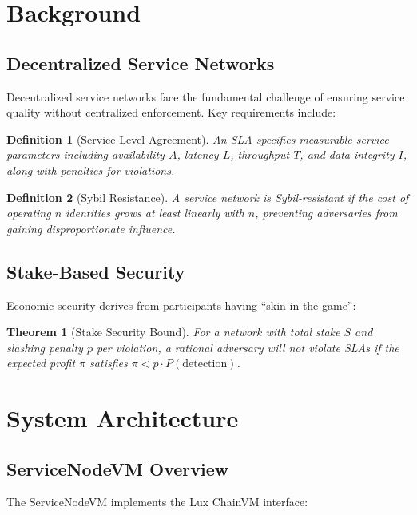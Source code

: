\documentclass[11pt,a4paper]{article}
\newtheorem{theorem}{Theorem}
\newtheorem{definition}{Definition}
\begin{document}
\section{Background}

\subsection{Decentralized Service Networks}

Decentralized service networks face the fundamental challenge of ensuring service quality without centralized enforcement. Key requirements include:

\begin{definition}[Service Level Agreement]
An SLA specifies measurable service parameters including availability $A$, latency $L$, throughput $T$, and data integrity $I$, along with penalties for violations.
\end{definition}

\begin{definition}[Sybil Resistance]
A service network is Sybil-resistant if the cost of operating $n$ identities grows at least linearly with $n$, preventing adversaries from gaining disproportionate influence.
\end{definition}

\subsection{Stake-Based Security}

Economic security derives from participants having ``skin in the game'':

\begin{theorem}[Stake Security Bound]
For a network with total stake $S$ and slashing penalty $p$ per violation, a rational adversary will not violate SLAs if the expected profit $\pi$ satisfies $\pi < p \cdot P(\text{detection})$.
\end{theorem}

\section{System Architecture}

\subsection{ServiceNodeVM Overview}

The ServiceNodeVM implements the Lux ChainVM interface:
\end{document}

